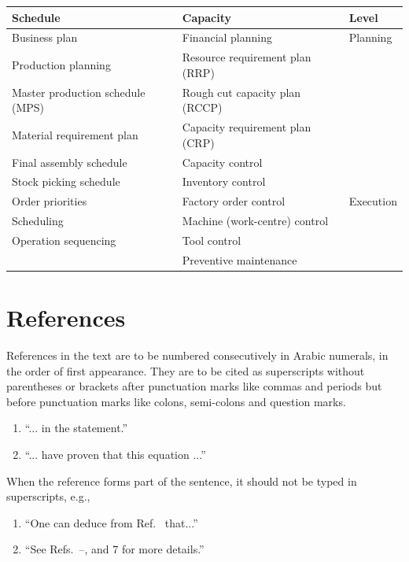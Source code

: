 \documentclass[11pt,twoside]{article}
\begin{document}
\begin{multicols}{2}
\begin{table}\centering %
{\small
\setlength{\extrarowheight}{3pt}
\baselineskip=13pt
\begin{tabular}{l@{\qquad}l@{\qquad}l}\\ \hline
Schedule	& Capacity	& Level \\ \hline
Business plan	& Financial planning	& Planning \\
Production planning	& Resource requirement plan (RRP) & \\	
Master production schedule (MPS)	& Rough cut capacity plan (RCCP) & \\	
Material requirement plan	& Capacity requirement plan (CRP) & \\	
Final assembly schedule	& Capacity control & \\	
Stock picking schedule	& Inventory control & \\	
Order priorities	& Factory order control	& Execution \\
Scheduling	& Machine (work-centre) control & \\	
Operation sequencing	& Tool control & \\	
	& Preventive maintenance	&  \\ \hline
\end{tabular}}\label{tab_plan}
\end{table}

\section{References}

References in the text are to be numbered consecutively in Arabic numerals, in the order of first appearance. They are to be cited as superscripts without parentheses or brackets after punctuation marks like commas and periods but before punctuation marks like colons, semi-colons and question marks. 
\begin{enumerate}[(1)]\Nospacing
\item %
``... in the statement.\cite{WS1995}''
\item %
``... have proven\cite{LB1999} that this equation ...''
\end{enumerate}
When the reference forms part of the sentence, it should not be typed in superscripts, e.g.,
\begin{enumerate}[(1)]\Nospacing
\item %
``One can deduce from Ref.~ that...''
\item %
``See Refs.~--,  and 7 for more details.''
\end{enumerate}


\end{multicols}
\end{document}

